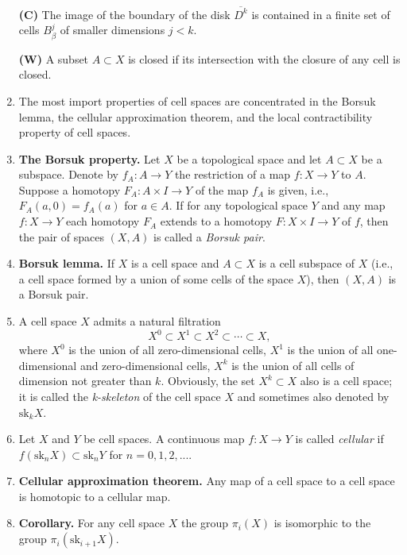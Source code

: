 \documentclass{ctexart}
\newcommand{\sk}[2]{\mathrm{sk}_{#1}#2}
\begin{document}
\begin{enumerate}
\textbf{(C)} The image of the boundary of the disk $\overline{D^k}$ is
contained in a finite set of cells $B_\beta^j$ of smaller dimensions
$j < k$.

\textbf{(W)} A subset $A \subset X$ is closed if its intersection with
the closure of any cell is closed.

\item The most import properties of cell spaces are concentrated in
  the Borsuk lemma, the cellular approximation theorem, and the local
  contractibility property of cell spaces.

\item \textbf{The Borsuk property.} Let $X$ be a topological space and
  let $A \subset X$ be a subspace. Denote by $f_A : A \to Y$ the
  restriction of a map $f : X \to Y$ to $A$. Suppose a homotopy $F_A :
  A \times I \to Y$ of the map $f_A$ is given, i.e., $F_A(a,0) =
  f_A(a)$ for $a \in A$. If for any topological space $Y$ and any map
  $f : X \to Y$ each homotopy $F_A$ extends to a homotopy $F : X
  \times I \to Y$ of $f$, then the pair of spaces $(X,A)$ is called a
  \textit{Borsuk pair}.

\item \textbf{Borsuk lemma.} If $X$ is a cell space and $A \subset X$
  is a cell subspace of $X$ (i.e., a cell space formed by a union of
  some cells of the space $X$), then $(X,A)$ is a Borsuk pair.

\item A cell space $X$ admits a natural filtration
\[
X^0 \subset X^1 \subset X^2 \subset \cdots \subset X,
\]
where $X^0$ is the union of all zero-dimensional cells, $X^1$ is the
union of all one-dimensional and zero-dimensional cells, $X^k$ is the
union of all cells of dimension not greater than $k$. Obviously, the
set $X^k \subset X$ also is a cell space; it is called the
\textit{k-skeleton} of the cell space $X$ and sometimes also denoted
by $\sk{k}{X}$.

\item Let $X$ and $Y$ be cell spaces. A continuous map $f : X \to Y$
  is called \textit{cellular} if $f(\sk{n}{X}) \subset \sk{n}{Y}$ for $n
  = 0,1,2,...$.

\item \textbf{Cellular approximation theorem.} Any map of a cell space
  to a cell space is homotopic to a cellular map.

\item \textbf{Corollary.} For any cell space $X$ the group $\pi_i(X)$
  is isomorphic to the group $\pi_i(\sk{i+1}{X})$.


\end{enumerate}
\end{document}
